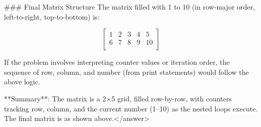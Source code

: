 ### Final Matrix Structure  
The matrix filled with 1 to 10 (in row-major order, left-to-right, top-to-bottom) is:  

\[
\begin{bmatrix}
1 & 2 & 3 & 4 & 5 \\
6 & 7 & 8 & 9 & 10 \\
\end{bmatrix}
\]  

If the problem involves interpreting counter values or iteration order, the sequence of row, column, and number (from print statements) would follow the above logic.  


**Summary**: The matrix is a 2×5 grid, filled row-by-row, with counters tracking row, column, and the current number (1–10) as the nested loops execute. The final matrix is as shown above.</answer>